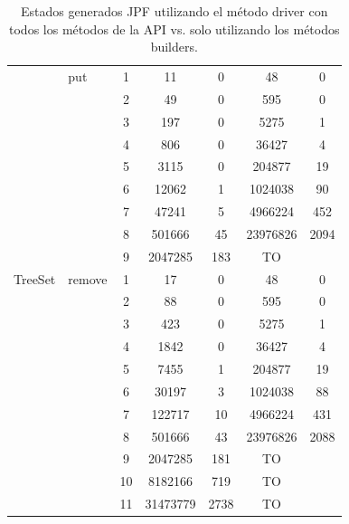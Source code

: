 \begin{table}
\begin{tabular}{ c| l| c c c c c}
\hline
\multirow{19}{*}{TreeSet} 
&put
  & 1 & 11  & 0 & 48  & 0 \\
& & 2 & 49  & 0 & 595 & 0 \\
& & 3 & 197 & 0 & 5275  & 1 \\
& & 4 & 806 & 0 & 36427 & 4 \\
& & 5 & 3115  & 0 & 204877  & 19  \\
& & 6 & 12062 & 1 & 1024038 & 90  \\
& & 7 & 47241 & 5 & 4966224 & 452 \\
& & 8 & 501666  & 45  & 23976826  & 2094  \\
& & 9 & 2047285 & 183 &TO  &  \\
\cline{2-7}

& remove
  & 1 & 17  & 0 & 48  & 0 \\
& & 2 & 88  & 0 & 595 & 0 \\
& & 3 & 423 & 0 & 5275  & 1 \\
& & 4 & 1842  & 0 & 36427 & 4 \\
& & 5 & 7455  & 1 & 204877  & 19  \\
& & 6 & 30197 & 3 & 1024038 & 88  \\
& & 7 & 122717  & 10  & 4966224 & 431 \\
& & 8 & 501666  & 43  & 23976826  & 2088  \\
& & 9 & 2047285 & 181 & TO    \\
& & 10  & 8182166 & 719 &    TO  \\
& & 11  & 31473779  & 2738  &  TO     \\
\hline

\end{tabular}%
\caption{Estados generados JPF utilizando el método driver con todos los métodos de la API vs. solo utilizando los métodos builders.}
\label{tab:results1-jpf}
 \end{table}

